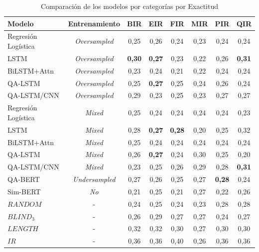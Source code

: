 \begin{table}[!tb]
  \begin{center}
    \caption{Comparación de los modelos por categorías por Exactitud}
    \begin{tabular}{l|c|c|c|c|c|c|c}
      \textbf{Modelo} & \textbf{Entrenamiento} & \textbf{BIR} & \textbf{EIR} & \textbf{FIR} & \textbf{MIR} & \textbf{PIR} & \textbf{QIR}\\
      \hline

      Regresión Logística & \textit{Oversampled} & 0,25 & 0,26 & 0,24 & 0,23 & 0,24 & 0,24 \\
      LSTM & \textit{Oversampled} & \textbf{0,30} & \textbf{0,27} & 0,23 & 0,22 & 0,26 & \textbf{0,31}\\
      BiLSTM+Attn & \textit{Oversampled} & 0,23 & 0,24 & 0,21 & 0,22 & 0,24 & 0,24\\
      QA-LSTM & \textit{Oversampled} & 0,25 & \textbf{0,27} & 0,25 & 0,24 & 0,26 & 0,24\\
      QA-LSTM/CNN & \textit{Oversampled} & 0,29 & 0,23 & 0,25 & 0,23 & 0,27 & 0,27\\

      Regresión Logística & \textit{Mixed} & 0,25 & 0,24 & 0,24 & 0,24 & 0,24 & 0,23\\
      LSTM & \textit{Mixed} & 0,28 & \textbf{0,27} & \textbf{0,28} & 0,20 & 0,25 & 0,32\\
      BiLSTM+Attn & \textit{Mixed} & 0,25 & 0,24 & 0,24 & 0,24 & 0,24 & 0,24 \\
      QA-LSTM & \textit{Mixed} & 0,26 & \textbf{0,27} & 0,24 & 0,30 & 0,25 & 0,20 \\
      QA-LSTM/CNN & \textit{Mixed} & 0,23 & 0,25 & 0,26 & 0,29 & 0,28 & \textbf{0,31} \\

      QA-BERT & \textit{Undersampled} & 0,27 & 0,26 & 0,25 & 0,27 & \textbf{0,28} & 0,24\\
      Sim-BERT & \textit{No} & 0,21 & 0,25 & 0,21 & 0,27 & 0,22 & 0,26\\
      \hline
      $RANDOM$ & - & 0,24 & 0,25 & 0,24 & 0,23 & 0,28 & 0,28 \\
      $BLIND_3$ & - & 0,26 & 0,29 & 0,27 & 0,27 & 0,24 & 0,27 \\
      $LENGTH$ & - & 0,32 & 0,32 & 0,30 & 0,27 & 0,30 & 0,30 \\
      $IR$ & - & 0,36 & 0,36 & 0,40 & 0,26 & 0,36 & 0,36 \\

    \end{tabular}
  \end{center}
  \label{comparison_accuracy}
\end{table}

